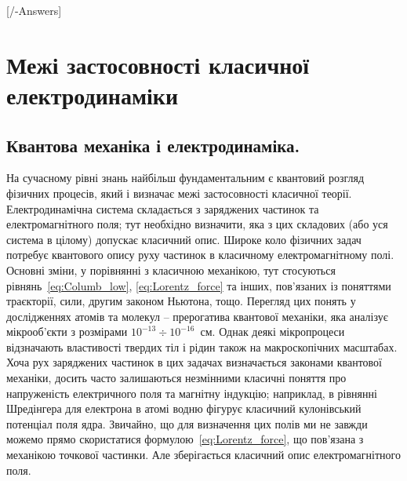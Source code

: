 
[\currfilebase/\currfilebase-Answers]
\chapter{Межі застосовності класичної електродинаміки}\label{\currfilebase}



\section{Квантова механіка і електродинаміка. }


На сучасному рівні знань найбільш фундаментальним є квантовий розгляд фізичних процесів, який і визначає межі застосовності класичної теорії.
Електродинамічна система складається з заряджених частинок та електромагнітного поля; тут необхідно визначити, яка з цих складових (або уся система в
цілому) допускає класичний опис. Широке коло фізичних задач потребує квантового опису руху частинок в класичному електромагнітному полі. Основні зміни,
у порівнянні з класичною механікою, тут стосуються рівнянь~\eqref{eq:Columb_low}, \eqref{eq:Lorentz_force} та інших, пов’язаних із поняттями траєкторії,
сили, другим законом Ньютона, тощо. Перегляд цих понять у дослідженнях атомів та молекул – прерогатива квантової механіки, яка аналізує мікрооб’єкти з
розмірами $10^{-13} \div 10^{-16}$~см. Однак деякі мікропроцеси відзначають властивості твердих тіл і рідин також на макроскопічних масштабах. Хоча рух
заряджених частинок в цих задачах визначається законами квантової механіки, досить часто залишаються незмінними класичні поняття про напруженість
електричного поля та магнітну індукцію; наприклад, в рівнянні Шредінгера для електрона в атомі водню фігурує класичний кулонівський потенціал поля ядра.
Звичайно, що для визначення цих полів ми не завжди можемо прямо скористатися формулою~\eqref{eq:Lorentz_force}, що пов’язана з механікою точкової
частинки. Але зберігається класичний опис електромагнітного поля.


